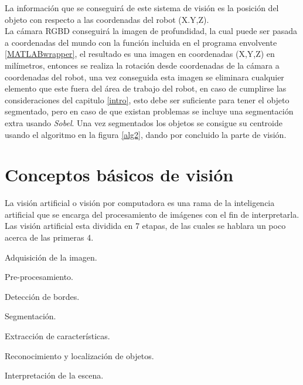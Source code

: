La información que se conseguirá de este sistema de visión es la posición del objeto con respecto a las coordenadas del robot (X.Y,Z).\\
La cámara RGBD conseguirá la imagen de profundidad, la cual puede ser pasada a coordenadas del mundo con la función incluida en el programa envolvente \cref{MATLABwrapper}, el resultado es una imagen en coordenadas (X,Y,Z) en milímetros, entonces se realiza la rotación desde coordenadas de la cámara a coordenadas del robot, una vez conseguida esta imagen se eliminara cualquier elemento que este fuera del área de trabajo del robot, en caso de cumplirse las consideraciones del  capitulo \ref{intro}, esto debe ser suficiente para tener el objeto segmentado, pero en caso de que existan problemas se incluye una segmentación extra usando \textit{Sobel}.
Una vez segmentados los objetos se consigue su centroide usando el algoritmo en la figura \ref{alg2}, dando por concluido la parte de visión.
    
    
    \section{Conceptos básicos de visión}
    
La visión artificial o visión por computadora es una rama de la inteligencia artificial que se encarga del procesamiento de imágenes con el fin de interpretarla.
Las visión artificial esta dividida en 7 etapas, de las cuales se hablara un poco acerca de las primeras 4.
    
    \begin{prop}
    	\item  Adquisición de la imagen. \label{viseta:1}
    	\item  Pre-procesamiento. \label{viseta:2}
		\item  Detección de bordes. \label{viseta:3}
		\item  Segmentación. \label{viseta:4}
		\item  Extracción de características. \label{viseta:5}
		\item  Reconocimiento y localización de objetos. \label{viseta:6}
		\item  Interpretación de la escena. \label{viseta:7}
	\end{prop} 
    
